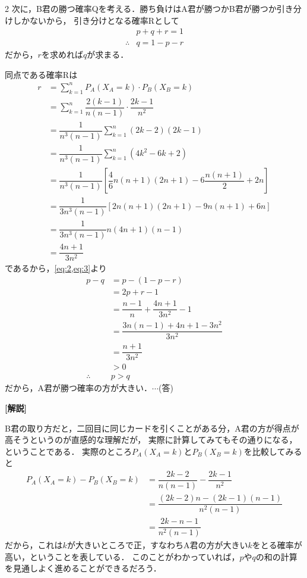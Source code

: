 \documentclass[../../main.tex]{subfiles}
\begin{document}
\begin{multicols}{2}
  次に，B君の勝つ確率Qを考える．勝ち負けはA君が勝つかB君が勝つか引き分けしかないから，
  引き分けとなる確率Rとして
  \begin{align}
    & p+q+r=1                        \\
    \therefore
    & q = 1 -p-r \label{eq:3}
  \end{align}
  だから，$r$を求めれば$q$が求まる．

  同点である確率Rは
  \begin{align}
    r
    & = \sum_{k=1}^n P_A(X_A=k) \cdot P_B(X_B=k)                                    \\
    & = \sum_{k=1}^n \dfrac{2(k-1)}{n(n-1)}  \cdot  \dfrac{2k-1}{n^2}                 \\
    & = \dfrac{1}{n^3(n-1)}\sum_{k=1}^n (2k-2)(2k-1)                                 \\
    & = \dfrac{1}{n^3(n-1)}\sum_{k=1}^n (4k^2-6k+2)                                  \\
    & = \dfrac{1}{n^3(n-1)}\left[\dfrac{4}{6}n(n+1)(2n+1)-6\dfrac{n(n+1)}{2}+2n\right] \\
    & = \dfrac{1}{3n^3(n-1)} \left[2n(n+1)(2n+1)-9n(n+1)+6n\right]                   \\
    & = \dfrac{1}{3n^3(n-1)} n(4n+1)(n-1)                                            \\
    & = \dfrac{4n+1}{3n^2}
  \end{align}
  であるから，\cref{eq:2,eq:3}より
  \begin{align}
    p-q
    & = p-(1-p-r)                            \\
    & = 2p+r-1                               \\
    & = \dfrac{n-1}{n} + \dfrac{4n+1}{3n^2} -1 \\
    & = \dfrac{3n(n-1)+4n+1-3n^2}{3n^2}       \\
    & = \dfrac{n+1}{3n^2}                     \\
    & > 0                                    \\
    \therefore
    & p > q
  \end{align}
  だから，A君が勝つ確率の方が大きい．$\cdots$(答)

  {\bf [解説]}

  B君の取り方だと，二回目に同じカードを引くことがある分，A君の方が得点が高そうというのが直感的な理解だが，
  実際に計算してみてもその通りになる，ということである．
  実際のところ$P_A(X_A=k)$と$P_B(X_B=k)$を比較してみると
  \begin{align}
    P_A(X_A=k)-P_B(X_B=k)
    & = \dfrac{2k-2}{n(n-1)} - \dfrac{2k-1}{n^2} \\
    & = \dfrac{(2k-2)n-(2k-1)(n-1)}{n^2(n-1)}   \\
    & = \dfrac{2k-n-1}{n^2(n-1)}
  \end{align}
  だから，これは$k$が大きいところで正，すなわちA君の方が大きい$k$をとる確率が高い，ということを表している．
  このことがわかっていれば，$p$や$q$の和の計算を見通しよく進めることができるだろう．


\end{multicols}
\end{document}
